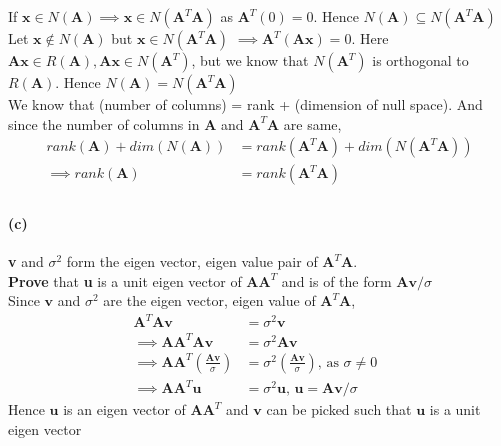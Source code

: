 \documentclass[12pt, letterpaper]{article}
\begin{document}
If $\mathbf{x} \in N(\mathbf{A}) \implies \mathbf{x} \in N(\mathbf{A}^T\mathbf{A})$ as $\mathbf{A}^T(0) = 0$.
Hence $N(\mathbf{A}) \subseteq N(\mathbf{A}^T\mathbf{A})$\\

Let $\mathbf{x} \not\in N(\mathbf{A})$ but $\mathbf{x} \in N(\mathbf{A}^T\mathbf{A})$ $\implies \mathbf{A}^T(\mathbf{Ax}) = 0$. Here $\mathbf{Ax} \in R(\mathbf{A}), \mathbf{Ax} \in N(\mathbf{A}^T)$, but we know that $N(\mathbf{A}^T)$ is orthogonal to $R(\mathbf{A})$. Hence $N(\mathbf{A}) = N(\mathbf{A}^T\mathbf{A})$\\

We know that (number of columns) = rank + (dimension of null space). And since the number of columns in $\mathbf{A}$ and $\mathbf{A}^T\mathbf{A}$ are same,
\begin{align*}
  rank(\mathbf{A}) + dim(N(\mathbf{A}))
  &= rank(\mathbf{A}^T\mathbf{A}) + dim(N(\mathbf{A}^T\mathbf{A}))\\
  \implies rank(\mathbf{A}) &= rank(\mathbf{A}^T\mathbf{A})\\
\end{align*}

\paragraph{(c)} \textbf{v} and $\sigma^2$ form the eigen vector, eigen value pair of $\mathbf{A}^T\mathbf{A}$.\\

\textbf{Prove} that \textbf{u} is a unit eigen vector of $\mathbf{AA}^T$ and is of the form $\mathbf{Av}/\sigma$\\

Since $\mathbf{v}$ and $\sigma^2$ are the eigen vector, eigen value of $\mathbf{A}^T\mathbf{A}$,
\begin{align*}
  \mathbf{A}^T\mathbf{Av} &= \sigma^2\mathbf{v}\\
  \implies \mathbf{AA}^T\mathbf{Av} &= \sigma^2\mathbf{Av}\\
  \implies \mathbf{AA}^T \left( \frac{\mathbf{Av}}{\sigma} \right)
  &= \sigma^2\left( \frac{\mathbf{Av}}{\sigma} \right) \text{, as $\sigma \not = 0$ }\\
  \implies \mathbf{AA}^T\mathbf{u} &= \sigma^2\mathbf{u} \text{, $\mathbf{u} = \mathbf{Av}/\sigma$}
\end{align*}
Hence $\mathbf{u}$ is an eigen vector of $\mathbf{AA}^T$ and $\mathbf{v}$ can be picked such that $\mathbf{u}$ is a unit eigen vector
\end{document}
